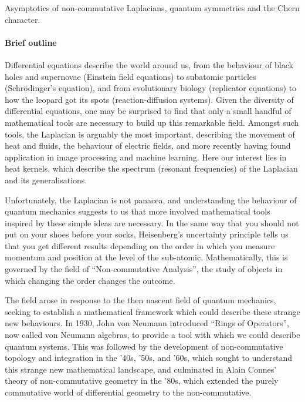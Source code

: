 \documentclass[12pt]{article}
\newcommand{\archeading}[1]{\vspace{.3cm} \noindent{\bfseries #1} \vspace{.1cm}   }
\begin{document}
\parindent=20pt
\pagestyle{empty}
\newpage

\archeading{Project Title} Asymptotics of non-commutative Laplacians, quantum symmetries and the Chern character.

\bigskip\archeading{Project quality and innovation}


\paragraph*{Brief outline} 

Differential equations describe the world around us,
from the behaviour of black holes and supernovae (Einstein field equations) to
subatomic particles (Schr\"odinger's equation),
and from evolutionary biology 
(replicator equations) to how the leopard got its spots (reaction-diffusion
systems).
Given the diversity of differential equations, one may be surprised to find that
only a small handful of mathematical tools are necessary to build up this
remarkable field.
Amongst such tools, the Laplacian is arguably the most
important, describing the movement of heat and fluids, the behaviour of electric
fields, and more recently having found application in image processing and
machine learning.
Here our interest lies in heat kernels, which describe the spectrum (resonant
frequencies) of the Laplacian and its generalisations.

Unfortunately, the Laplacian is not panacea, and understanding the behaviour of
quantum mechanics suggests to us that more involved mathematical tools inspired
by these simple ideas are necessary.
In the same way that you should not put on your shoes before your socks,
Heisenberg's uncertainty principle tells us that you get different results
depending on the order in which you measure momentum and position at the level
of the sub-atomic.
Mathematically, this is governed by the field of ``Non-commutative Analysis'',
the study of objects in which changing the order changes the outcome.

The field arose in response to the then nascent field of quantum mechanics,
seeking to establish a mathematical framework which could describe these strange
new behaviours.
In 1930, John von Neumann introduced ``Rings of Operators'', now called von Neumann
algebras, to provide a tool with which we could describe quantum systems.
This was followed by the development of non-commutative topology and integration
in the '40s, '50s, and '60s, which sought to understand this strange new
mathematical landscape, and culminated in Alain Connes' theory of non-commutative
geometry in the '80s, which extended the purely commutative world of 
differential geometry to the non-commutative.
\end{document}
